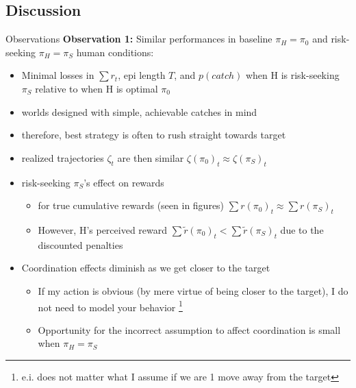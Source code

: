 \documentclass[aspectratio=1610, xcolor=dvipsnames]{packages/beamer}
\begin{document}
\subsection{Discussion}

\begin{frame}{Observations}
        \textbf{Observation 1:} Similar performances in baseline $\pi_H = \pi_0$ and risk-seeking $\pi_H = \pi_S$ human conditions:
        \begin{itemize}
            \item Minimal losses in $\sum r_t$, epi length $T$, and $p(catch)$ when H is risk-seeking $\pi_S$ relative to when H is optimal  $\pi_0$
            \item worlds designed with simple, achievable catches in mind
            \item therefore, best strategy is often to rush straight towards target
            \item realized trajectories $\zeta_t$ are then similar $\zeta(\pi_0)_t \approx \zeta(\pi_S)_t$
            \item risk-seeking $\pi_S$'s effect on rewards
            \begin{itemize}
                \item for true cumulative rewards (seen in figures) $\sum r(\pi_0)_t \approx \sum r(\pi_S)_t $
                \item However, H's perceived reward $\sum \tilde{r}(\pi_0)_t < \sum \tilde{r}(\pi_S)_t$ due to the discounted penalties
            \end{itemize}
            \item Coordination effects diminish as we get closer to the target
            \begin{itemize}
                \item If my action is obvious (by mere virtue of being closer to the target), I do not need to model your behavior
                    \footnote{e.i. does not matter what I assume if we are 1 move away from the target}
                \item Opportunity for the incorrect assumption to affect coordination is small when $\pi_H = \pi_S$
            \end{itemize}
        \end{itemize}
\end{frame}
\end{document}
